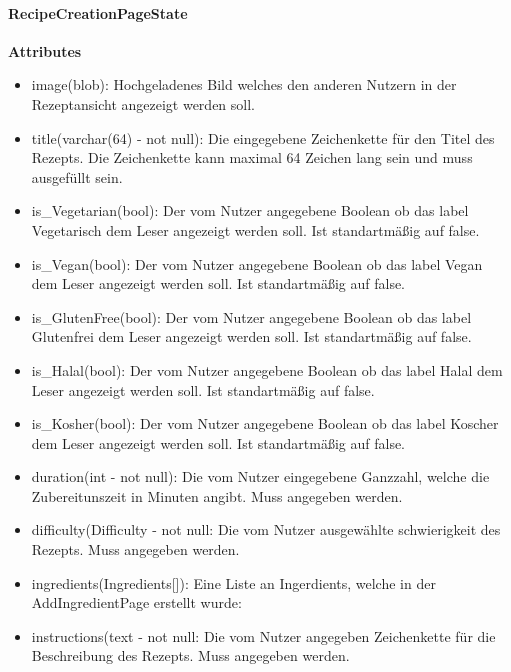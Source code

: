 \documentclass[parskip=full]{scrartcl}
\begin{document}
        \paragraph{RecipeCreationPageState}
            \textbf{Attributes}
                \begin{itemize}
                    \item image(blob): Hochgeladenes Bild welches den anderen Nutzern in der Rezeptansicht angezeigt werden soll.
                    \item title(varchar(64) - not null): Die eingegebene Zeichenkette für den Titel des Rezepts. Die Zeichenkette kann maximal 64 Zeichen lang sein und muss ausgefüllt sein.
                    \item is\_Vegetarian(bool): Der vom Nutzer angegebene Boolean ob das \gls{label} Vegetarisch dem Leser angezeigt werden soll. Ist standartmäßig auf false.
                    \item is\_Vegan(bool): Der vom Nutzer angegebene Boolean ob das \gls{label} Vegan dem Leser angezeigt werden soll. Ist standartmäßig auf false.
                    \item is\_GlutenFree(bool): Der vom Nutzer angegebene Boolean ob das \gls{label} Glutenfrei dem Leser angezeigt werden soll.  Ist standartmäßig auf false.
                    \item is\_Halal(bool): Der vom Nutzer angegebene Boolean ob das \gls{label} Halal dem Leser angezeigt werden soll.  Ist standartmäßig auf false.
                    \item is\_Kosher(bool): Der vom Nutzer angegebene Boolean ob das \gls{label} Koscher dem Leser angezeigt werden soll.  Ist standartmäßig auf false.
                    \item duration(int - not null): Die vom Nutzer eingegebene Ganzzahl, welche die Zubereitunszeit in Minuten angibt. Muss angegeben werden.
                    \item difficulty(Difficulty - not null: Die vom Nutzer ausgewählte \gls{schwierigkeit} des Rezepts. Muss angegeben werden.
                    \item ingredients(Ingredients[]): Eine Liste an Ingerdients, welche in der AddIngredientPage erstellt wurde:
                    \item instructions(text - not null: Die vom Nutzer angegeben Zeichenkette für die Beschreibung des Rezepts. Muss angegeben werden.
                \end{itemize}
            
\end{document}
